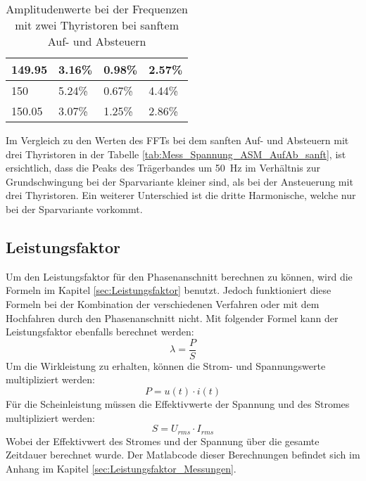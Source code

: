 \begin{table}[ht!]
\begin{tabular}{|l|l|l|l|}
		149.95            & 3.16\%                                                                              & 0.98\%                                                                              & 2.57\%                                                                              \\ \hline
		150               & 5.24\%                                                                              & 0.67\%                                                                              & 4.44\%                                                                              \\ \hline
		150.05            & 3.07\%                                                                              & 1.25\%                                                                              & 2.86\%                                                                              \\ \hline
	\end{tabular}
\caption{Amplitudenwerte bei der Frequenzen mit zwei Thyristoren bei sanftem Auf- und Absteuern}\label{tab:Mess_2Thyristoren_Spannung_ASM_AufAb_sanft}
\end{table}

Im Vergleich zu den Werten des FFTs bei dem sanften Auf- und Absteuern mit drei Thyristoren in der Tabelle \ref{tab:Mess_Spannung_ASM_AufAb_sanft}, ist ersichtlich, dass die Peaks des Trägerbandes um \SI{50}{Hz} im Verhältnis zur Grundschwingung bei der Sparvariante kleiner sind, als bei der Ansteuerung mit drei Thyristoren. Ein weiterer Unterschied ist die dritte Harmonische, welche nur bei der Sparvariante vorkommt. 


\newpage
\subsection{Leistungsfaktor}
Um den Leistungsfaktor für den Phasenanschnitt berechnen zu können, wird die Formeln im Kapitel \ref{sec:Leistungsfaktor} benutzt. Jedoch funktioniert diese Formeln bei der Kombination der verschiedenen Verfahren oder mit dem Hochfahren durch den Phasenanschnitt nicht. Mit folgender Formel kann der Leistungsfaktor ebenfalls berechnet werden:
\begin{equation}
\lambda = \frac{P}{S}
\end{equation}
Um die Wirkleistung zu erhalten, können die Strom- und Spannungswerte multipliziert werden:
\begin{equation}
P = u(t) \cdot i(t)
\end{equation}
Für die Scheinleistung müssen die Effektivwerte der Spannung und des Stromes multipliziert werden:
\begin{equation}
S = U_{rms} \cdot I_{rms}
\end{equation}
Wobei der Effektivwert des Stromes und der Spannung über die gesamte Zeitdauer berechnet wurde. Der Matlabcode dieser Berechnungen befindet sich im Anhang im Kapitel \ref{sec:Leistungsfaktor_Messungen}. 

